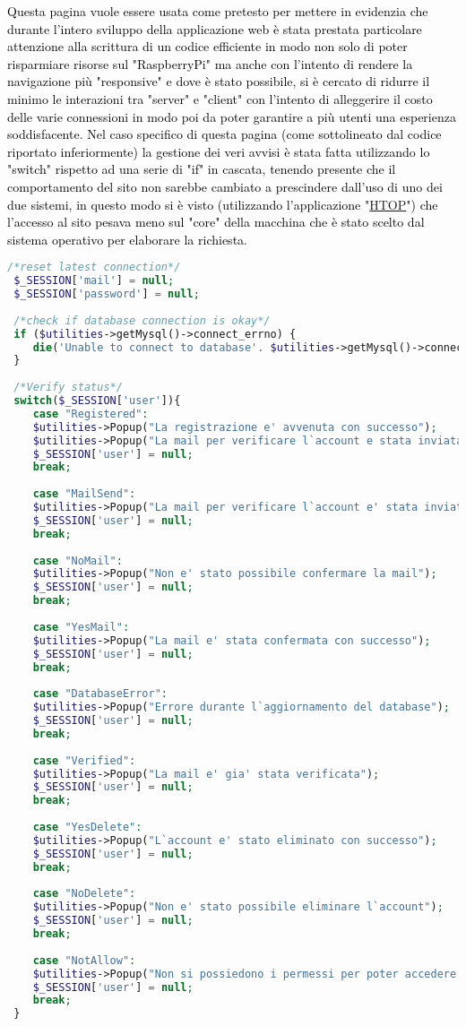   \textcolor{black}{Questa pagina vuole essere usata come pretesto per mettere in evidenzia che durante l'intero sviluppo della applicazione web è stata prestata particolare attenzione alla scrittura di un codice efficiente in modo non solo di poter risparmiare risorse sul "RaspberryPi" ma anche con l'intento di rendere la navigazione più "responsive" e dove è stato possibile, si è cercato di ridurre il minimo le interazioni tra "server" e "client" con l'intento di alleggerire il costo delle varie connessioni in modo poi da poter garantire a più utenti una esperienza soddisfacente. Nel caso specifico di questa pagina (come sottolineato dal codice riportato inferiormente) la gestione dei veri avvisi è stata fatta utilizzando lo "switch" rispetto ad una serie di "if" in cascata, tenendo presente che il comportamento del sito non sarebbe cambiato a prescindere dall'uso di uno dei due sistemi, in questo modo si è visto (utilizzando l'applicazione "\href{https://htop.dev/}{HTOP}") che l'accesso al sito pesava meno sul "core" della macchina che è stato scelto dal sistema operativo per elaborare la richiesta.}\\
  
 \begin{lstlisting}[language=php]
 /*reset latest connection*/
 $_SESSION['mail'] = null;
 $_SESSION['password'] = null;
 
 /*check if database connection is okay*/
 if ($utilities->getMysql()->connect_errno) {
 	die('Unable to connect to database'. $utilities->getMysql()->connect_error);
 }
 
 /*Verify status*/
 switch($_SESSION['user']){
 	case "Registered":
 	$utilities->Popup("La registrazione e' avvenuta con successo");
 	$utilities->Popup("La mail per verificare l`account e stata inviata");
 	$_SESSION['user'] = null;
 	break;
 	
 	case "MailSend":
 	$utilities->Popup("La mail per verificare l`account e' stata inviata");
 	$_SESSION['user'] = null;
 	break;
 	
 	case "NoMail":
 	$utilities->Popup("Non e' stato possibile confermare la mail");
 	$_SESSION['user'] = null;
 	break;
 	
 	case "YesMail":
 	$utilities->Popup("La mail e' stata confermata con successo");
 	$_SESSION['user'] = null;
 	break;
 	
 	case "DatabaseError":
 	$utilities->Popup("Errore durante l`aggiornamento del database");
 	$_SESSION['user'] = null;
 	break;
 	
 	case "Verified":
 	$utilities->Popup("La mail e' gia' stata verificata");
 	$_SESSION['user'] = null;
 	break;
 	
 	case "YesDelete":
 	$utilities->Popup("L`account e' stato eliminato con successo");
 	$_SESSION['user'] = null;
 	break;
 	
 	case "NoDelete":
 	$utilities->Popup("Non e' stato possibile eliminare l`account");
 	$_SESSION['user'] = null;
 	break;
 	
 	case "NotAllow":
 	$utilities->Popup("Non si possiedono i permessi per poter accedere alla pagina");
 	$_SESSION['user'] = null;
 	break;
 }
\end{lstlisting}

